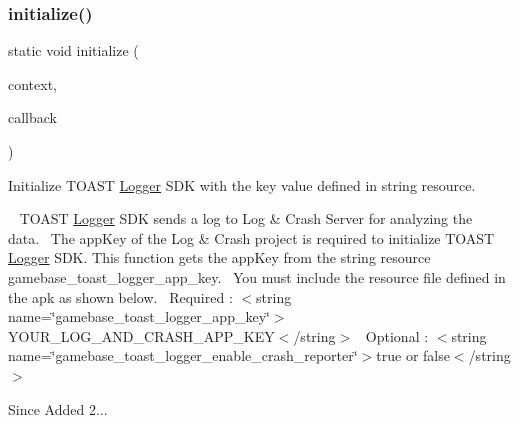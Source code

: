 \subsubsection{\texorpdfstring{initialize()}{initialize()}\hspace{0.1cm}{\footnotesize\ttfamily [2/2]}}
{\footnotesize\ttfamily static void initialize (\begin{DoxyParamCaption}\item[{@Non\+Null final Context}]{context,  }\item[{@Non\+Null final \hyperlink{interfacecom_1_1toast_1_1android_1_1gamebase_1_1_gamebase_callback}{Gamebase\+Callback}}]{callback }\end{DoxyParamCaption})\hspace{0.3cm}{\ttfamily [static]}}



Initialize T\+O\+A\+ST \hyperlink{classcom_1_1toast_1_1android_1_1gamebase_1_1_gamebase_1_1_logger}{Logger} S\+DK with the key value defined in string resource. 

~\newline
 T\+O\+A\+ST \hyperlink{classcom_1_1toast_1_1android_1_1gamebase_1_1_gamebase_1_1_logger}{Logger} S\+DK sends a log to Log \& Crash Server for analyzing the data.~\newline
 The app\+Key of the Log \& Crash project is required to initialize T\+O\+A\+ST \hyperlink{classcom_1_1toast_1_1android_1_1gamebase_1_1_gamebase_1_1_logger}{Logger} S\+DK. This function gets the app\+Key from the string resource \textquotesingle{}gamebase\+\_\+toast\+\_\+logger\+\_\+app\+\_\+key\textquotesingle{}.~\newline
 You must include the resource file defined in the apk as shown below.~\newline
 Required \+: $<$string name=\char`\"{}gamebase\+\_\+toast\+\_\+logger\+\_\+app\+\_\+key\char`\"{}$>$Y\+O\+U\+R\+\_\+\+L\+O\+G\+\_\+\+A\+N\+D\+\_\+\+C\+R\+A\+S\+H\+\_\+\+A\+P\+P\+\_\+\+K\+EY$<$/string$>$~\newline
 Optional \+: $<$string name=\char`\"{}gamebase\+\_\+toast\+\_\+logger\+\_\+enable\+\_\+crash\+\_\+reporter\char`\"{}$>$true or false$<$/string$>$

\begin{DoxySince}{Since}
Added 2... 
\end{DoxySince}

